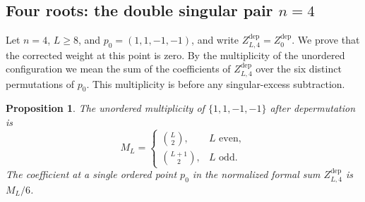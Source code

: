 \documentclass[11pt]{article}
\newtheorem{proposition}{Proposition}[section]
\theoremstyle{definition}
\begin{document}
\subsection{Four roots: the double singular pair $n=4$}
\label{sec:n4-double-pair}

Let $n=4$, $L\ge8$, and $p_0=(1,1,-1,-1)$, and write
$Z^{\mathrm{dep}}_{L,4}=Z^{\mathrm{dep}}_0$. We prove that the corrected
weight at this point is zero. By the multiplicity of the
unordered configuration we mean the sum of the coefficients of
$Z^{\mathrm{dep}}_{L,4}$ over the six distinct permutations of $p_0$.
This multiplicity is before any singular-excess subtraction.

\begin{proposition}\label{prop:n4-double-pair}
The unordered multiplicity of $\{1,1,-1,-1\}$ after depermutation is
\begin{equation}\label{eq:n4-double-pair}
 \boxed{M_L=
 \begin{cases}
 \displaystyle\binom L2,&L\text{ even},\\[2pt]
 \displaystyle\binom{L+1}2,&L\text{ odd}.
 \end{cases}}
\end{equation}
The coefficient at a single ordered point $p_0$ in the normalized formal sum
$Z^{\mathrm{dep}}_{L,4}$ is $M_L/6$.
\end{proposition}
\end{document}
